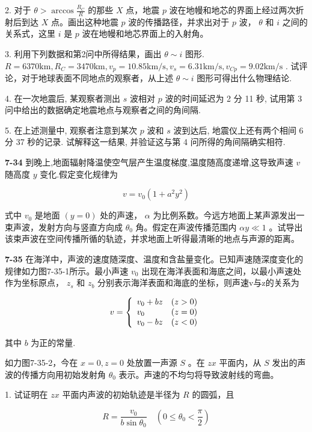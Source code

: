 2. 对于 $\theta > \arccos \frac{R_C}{R}$ 的那些 $X$ 点，地震 $p$ 波在地幔和地芯的界面上经过两次折射后到达 $X$ 点。画出这种地震 $p$ 波的传播路径，并求出对于 $p$ 波， $\theta$ 和 $i$ 之间的关系式，这里 $i$ 是 $p$ 波在地幔和地芯界面上的入射角。

3. 利用下列数据和第2问中所得结果，画出 $\theta \sim i$ 图形. $R = 6370\mathrm{km}, R_C = 3470\mathrm{km}, v_p = 10.85\mathrm{km/s}, v_s = 6.31\mathrm{km/s}, v_{Cp} = 9.02\mathrm{km/s}$ . 试评论，对于地球表面不同地点的观察者，从上述 $\theta \sim i$ 图形可得出什么物理结论.

4. 在一次地震后, 某观察者测出 $s$ 波相对 $p$ 波的时间延迟为 2 分 11 秒, 试用第 3 问中给出的数据确定地震地点与观察者之间的角间隔.

5. 在上述测量中, 观察者注意到某次 $p$ 波和 $s$ 波到达后, 地震仪上还有两个相间 6 分 37 秒的记录. 试解释这一结果, 并验证这与第 4 问所得的角间隔确实相符.
\vfill
\newpage

\textbf{7-34} 到晚上,地面辐射降温使空气层产生温度梯度,温度随高度递增,这导致声速 $v$ 随高度 $y$ 变化.假定变化规律为

$$
v = v _ {0} (1 + a ^ {2} y ^ {2})
$$

式中 $v_{0}$ 是地面 $(y = 0)$ 处的声速， $\alpha$ 为比例系数。今远方地面上某声源发出一束声波，发射方向与竖直方向成 $\theta_{0}$ 角。假定在声波传播范围内 $\alpha y \ll 1$ 。试导出该束声波在空间传播所循的轨迹，并求地面上听得最清晰的地点与声源的距离。
\vfill
\newpage

\textbf{7-35} 在海洋中，声波的速度随深度、温度和含盐量变化。已知声速随深度变化的规律如力图7-35-1所示。最小声速 $v_{0}$ 出现在海洋表面和海底之间，以最小声速处作为坐标原点， $z_{s}$ 和 $z_{b}$ 分别表示海洋表面和海底的坐标，则声速v与z的关系为

$$
v = \left\{ \begin{array}{l l} v _ {0} + b z & (z > 0) \\ v _ {0} & (z = 0) \\ v _ {0} - b z & (z <   0) \end{array} \right.
$$

其中 $b$ 为正的常量.

如力图7-35-2，今在 $x = 0, z = 0$ 处放置一声源 $S$ 。在 $zx$ 平面内，从 $S$ 发出的声波的传播方向用初始发射角 $\theta_0$ 表示。声速的不均匀将导致波射线的弯曲。

1. 试证明在 $zx$ 平面内声波的初始轨迹是半径为 $R$ 的圆弧，且

$$
R = \frac {v _ {0}}{b \sin \theta_ {0}} \quad \left(0 \leqslant \theta_ {0} <   \frac {\pi}{2}\right)
$$

